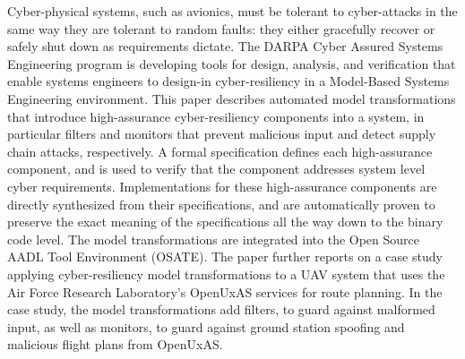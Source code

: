 Cyber-physical systems, such as avionics, must be tolerant to
cyber-attacks in the same way they are tolerant to random faults: they
either gracefully recover or safely shut down as requirements dictate.
The DARPA Cyber Assured Systems Engineering program is developing
tools for design, analysis, and verification that enable systems
engineers to design-in cyber-resiliency in a Model-Based Systems
Engineering environment.  This paper describes automated model
transformations that introduce high-assurance cyber-resiliency
components into a system, in particular filters and monitors that
prevent malicious input and detect supply chain attacks, respectively.
A formal specification defines each high-assurance component, and is
used to verify that the component addresses system level cyber
requirements.  Implementations for these high-assurance components are
directly synthesized from their specifications, and are automatically
proven to preserve the exact meaning of the specifications all the way
down to the binary code level.  The model transformations are
integrated into the Open Source AADL Tool Environment (OSATE).  The
paper further reports on a case study applying cyber-resiliency model
transformations to a UAV system that uses the Air Force Research
Laboratory's OpenUxAS services for route planning.  In the case study,
the model transformations add filters, to guard against malformed
input, as well as monitors, to guard against ground station spoofing
and malicious flight plans from OpenUxAS.

